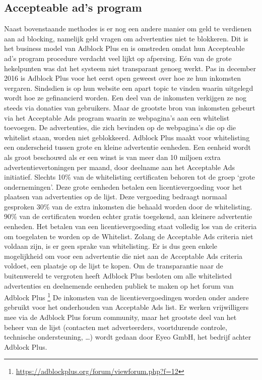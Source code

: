 \documentclass[pdftex,a4paper,12pt,twoside]{report}
\begin{document}
\subsection{ Accepteable ad's program}
\label{sec:Accepteable ad's program}
Naast bovenstaande methodes is er nog een andere manier om geld te verdienen aan ad blocking, namelijk geld vragen om advertenties niet te blokkeren. Dit is het business model van Adblock Plus en is omstreden omdat hun Accepteable ad's program procedure verdacht veel lijkt op afpersing. Eén van de grote hekelpunten was dat  het systeem niet transparant genoeg werkt. Pas in december 2016 is Adblock Plus voor het eerst open geweest over hoe ze hun inkomsten vergaren. Sindsdien is op hun website een apart topic te vinden waarin uitgelegd wordt hoe ze gefinancierd worden. Een deel van de inkomsten verkijgen ze nog steeds via donaties van gebruikers.
Maar de grootste bron van inkomsten gebeurt via het Acceptable Ads program waarin ze webpagina's aan een whitelist toevoegen. De advertenties, die zich bevinden op de webpagina's die op die whitelist staan, worden niet geblokkeerd. 
Adblock Plus maakt voor whitelisting een onderscheid tussen grote en kleine advertentie eenheden. Een eenheid wordt als groot beschouwd als er een winst is van meer dan 10 miljoen extra advertentievertoningen per maand, door deelname aan het Acceptable Ads initiatief. Slechts 10\% van de whitelisting certificaten behoren tot de groep ‘grote ondernemingen’. Deze grote eenheden betalen een licentievergoeding voor het plaatsen van advertenties op de lijst. Deze vergoeding bedraagt normaal gesproken 30\% van de extra inkomsten die behaald worden door de whitelisting. 90\% van de certificaten worden echter gratis toegekend, aan kleinere advertentie eenheden. Het betalen van een licentievergoeding staat volledig los van de criteria om toegelaten te worden op de Whitelist. Zolang de Acceptable Ads criteria niet voldaan zijn, is er geen sprake van whitelisting. Er is dus geen enkele mogelijkheid om voor een advertentie die niet aan de Acceptable Ads criteria voldoet, een plaatsje op de lijst te kopen. Om de transparantie naar de buitenwereld te vergroten heeft Adblock Plus besloten om alle whitelisted advertenties en deelnemende eenheden publiek te maken op het forum van Adblock Plus \footnote{\url{https://adblockplus.org/forum/viewforum.php?f=12}}
De inkomsten van de licentievergoedingen worden onder andere gebruikt voor het onderhouden van Acceptable Ads list. Er werken vrijwilligers mee via de Adblock Plus forum community, maar het grootste deel van het beheer van de lijst (contacten met adverteerders, voortdurende controle, technische ondersteuning, …) wordt gedaan  door Eyeo GmbH, het bedrijf achter Adblock Plus.
\end{document}
